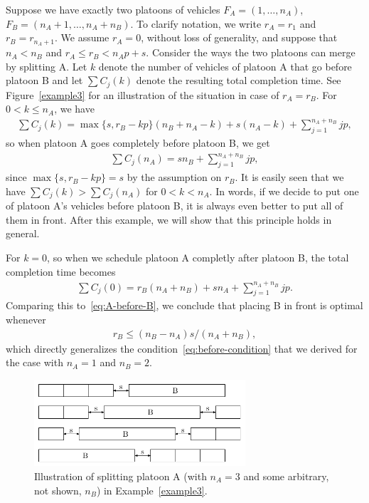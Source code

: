 \documentclass{article}
\theoremstyle{definition}
\theoremstyle{plain}
\begin{document}
\begin{eg}
  \label{example3}
  Suppose we have exactly two platoons of vehicles $F_{A} = (1, \dots, n_{A})$,
  $F_{B} = (n_{A} + 1, \dots, n_{A} + n_{B})$. To clarify notation, we write
  $r_{A} = r_{1}$ and $r_{B} = r_{n_{A} + 1}$. We assume $r_{A} = 0$, without
  loss of generality, and suppose that $n_{A} < n_{B}$ and
  $r_{A} \leq r_{B} < n_{A}p + s$. Consider the ways the two platoons can merge
  by splitting A. Let $k$ denote the number of vehicles of platoon A that go
  before platoon B and let $\sum C_{j}(k)$ denote the resulting total completion
  time. See Figure~\ref{example3} for an illustration of the situation in case of
  $r_{A} = r_{B}$. For $0 < k \leq n_{A}$, we have
  \begin{align*}
    \sum C_{j} (k) = \max\{ s, r_{B} - kp\} (n_{B} + n_{A} - k) + s (n_{A} - k) + \sum_{j=1}^{n_{A}+n_{B}} jp ,
  \end{align*}
  so when platoon A goes completely before platoon B, we get
  \begin{align}
    \sum C_{j} (n_{A}) = s n_{B} + \sum_{j=1}^{n_{A}+n_{B}} jp ,
    \label{eq:A-before-B}
  \end{align}
  since $\max\{ s, r_{B} - kp \} = s$ by the assumption on $r_{B}$. It is easily
  seen that we have $\sum C_{j}(k) > \sum C_{j} (n_{A})$ for $0 < k < n_{A}$. In
  words, if we decide to put one of platoon A's vehicles before platoon B, it is
  always even better to put all of them in front. After this example, we will
  show that this principle holds in general.

  For $k=0$, so when we schedule platoon A completly after platoon B, the total
  completion time becomes
  \begin{align*}
    \sum C_{j} (0) = r_{B} (n_{A} + n_{B}) + s n_{A} + \sum_{j=1}^{n_{A}+n_{B}} jp .
  \end{align*}
  Comparing this to~\eqref{eq:A-before-B}, we conclude that placing B in front
  is optimal whenever
  \begin{align*}
    r_{B} \leq (n_{B} - n_{A}) s / (n_{A} + n_{B}) ,
  \end{align*}
  which directly generalizes the condition~\eqref{eq:before-condition} that we
  derived for the case with $n_{A} = 1$ and $n_{B} = 2$.
\end{eg}

\begin{figure}
  \centering
  \includegraphics[width=0.70\textwidth]{figures/platoons.pdf}
  \caption{Illustration of splitting platoon A (with $n_{A}=3$ and some arbitrary, not shown, $n_{B}$) in Example~\ref{example3}.}
  \label{fig:example3}
\end{figure}
\end{document}
